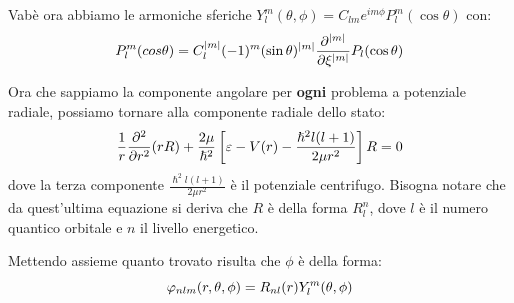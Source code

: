Vabè ora abbiamo le armoniche sferiche $Y_l^m(\theta, \phi) = C_{lm}e^{im\phi}P_l^m(\cos \theta)$ con:
\[
    P_l^m(cos \theta) = C_l^{\abs m}(-1)^m(\sin \theta)^{\abs m} \frac{\partial^{\abs m}}{\partial \xi^{\abs m}}P_l(\cos \theta)
\]

Ora che sappiamo la componente angolare per \textbf{ogni} problema a potenziale radiale, possiamo tornare alla componente radiale dello stato:
\[
    \frac{1}{r}\sderiv[r]{}(rR)+\frac{2\mu}{\hslash^2}\left[ \varepsilon - V(r) - \frac{\hslash^2 l (l+1)}{2\mu r^2} \right] R = 0
\]
dove la terza componente $\frac{\hslash^2 l (l+1)}{2\mu r^2}$ è il potenziale centrifugo. Bisogna notare che da quest'ultima equazione si deriva che $R$ è della forma $R_l^n$, dove $l$ è il numero quantico orbitale e $n$ il livello energetico.

Mettendo assieme quanto trovato risulta che $\phi$ è della forma:
\[
    \vphi_{nlm}(r, \theta,\phi ) = R_{nl}(r)Y_l^m(\theta, \phi)
\]

